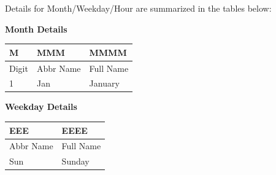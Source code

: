 \documentclass[12pt,]{article}
\begin{document}
Details for Month/Weekday/Hour are summarized in the tables below:

\textbf{Month Details}

\begin{longtable}[c]{@{}lll@{}}
\toprule
\begin{minipage}[b]{0.10\columnwidth}\raggedright\strut
M
\strut\end{minipage} &
\begin{minipage}[b]{0.15\columnwidth}\raggedright\strut
MMM
\strut\end{minipage} &
\begin{minipage}[b]{0.15\columnwidth}\raggedright\strut
MMMM
\strut\end{minipage}\tabularnewline
\midrule
\endhead
\begin{minipage}[t]{0.10\columnwidth}\raggedright\strut
Digit
\strut\end{minipage} &
\begin{minipage}[t]{0.15\columnwidth}\raggedright\strut
Abbr Name
\strut\end{minipage} &
\begin{minipage}[t]{0.15\columnwidth}\raggedright\strut
Full Name
\strut\end{minipage}\tabularnewline
\begin{minipage}[t]{0.10\columnwidth}\raggedright\strut
1
\strut\end{minipage} &
\begin{minipage}[t]{0.15\columnwidth}\raggedright\strut
Jan
\strut\end{minipage} &
\begin{minipage}[t]{0.15\columnwidth}\raggedright\strut
January
\strut\end{minipage}\tabularnewline
\bottomrule
\end{longtable}

\textbf{Weekday Details}

\begin{longtable}[c]{@{}ll@{}}
\toprule
\begin{minipage}[b]{0.16\columnwidth}\raggedright\strut
EEE
\strut\end{minipage} &
\begin{minipage}[b]{0.16\columnwidth}\raggedright\strut
EEEE
\strut\end{minipage}\tabularnewline
\midrule
\endhead
\begin{minipage}[t]{0.16\columnwidth}\raggedright\strut
Abbr Name
\strut\end{minipage} &
\begin{minipage}[t]{0.16\columnwidth}\raggedright\strut
Full Name
\strut\end{minipage}\tabularnewline
\begin{minipage}[t]{0.16\columnwidth}\raggedright\strut
Sun
\strut\end{minipage} &
\begin{minipage}[t]{0.16\columnwidth}\raggedright\strut
Sunday
\strut\end{minipage}\tabularnewline
\bottomrule
\end{longtable}
\end{document}
